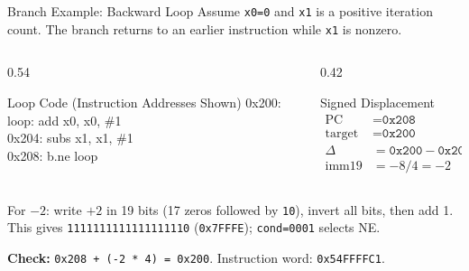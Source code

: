 \documentclass[aspectratio=169,11pt,t]{beamer}
\newcommand{\key}[1]{\textbf{#1}}
\newcommand{\hex}[1]{\texttt{0x#1}}
\newcommand{\code}[1]{\texttt{#1}}
\newcommand{\bfld}[5]{%
  \pgfmathsetmacro{\cx}{#1 + #3/2}%
  \fill[#5] (#1,#2) rectangle ++(#3,0.72);%
  \draw[navy,line width=0.7pt] (#1,#2) rectangle ++(#3,0.72);%
  \node[font=\scriptsize\ttfamily,text height=1.5ex,text depth=0.35ex,align=center,text=darkgray] at (\cx,#2+0.36) {#4};%
}
\begin{document}










\begin{frame}{Branch Example: Backward Loop}
\small
Assume \code{x0=0} and \code{x1} is a positive iteration count. The branch returns to an earlier instruction while \code{x1} is nonzero.
\vspace{0.12cm}
\begin{columns}[T,onlytextwidth]
\begin{column}{0.54\textwidth}
\begin{block}{Loop Code (Instruction Addresses Shown)}
\ttfamily\small
0x200: loop: add x0, x0, \#1\\[0.08cm]
0x204: \phantom{loop: }subs x1, x1, \#1\\[0.08cm]
0x208: \phantom{loop: }b.ne loop
\end{block}
\end{column}
\begin{column}{0.42\textwidth}
\begin{block}{Signed Displacement}
\[
\begin{aligned}
\text{PC} &= \hex{208} \\
\text{target} &= \hex{200} \\
\Delta &= \hex{200}-\hex{208} = -8 \\
\text{imm19} &= -8/4 = -2
\end{aligned}
\]
\end{block}
\end{column}
\end{columns}
\vspace{0.12cm}
For $-2$: write $+2$ in 19 bits (17 zeros followed by \code{10}), invert all bits, then add 1. This gives \code{1111111111111111110} (\hex{7FFFE}); \code{cond=0001} selects NE.
\begin{center}
\end{center}
\key{Check:} \code{0x208 + (-2 * 4) = 0x200}. Instruction word: \hex{54FFFFC1}.\\[0.05cm]
\end{frame}
\end{document}
